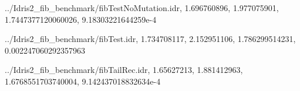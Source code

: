 \documentclass[
]{article}
\newenvironment{Shaded}{}{}
\newcommand{\DataTypeTok}[1]{\textcolor[rgb]{0.56,0.13,0.00}{#1}}
\newcommand{\FloatTok}[1]{\textcolor[rgb]{0.25,0.63,0.44}{#1}}
\newcommand{\NormalTok}[1]{#1}
\newcommand{\OperatorTok}[1]{\textcolor[rgb]{0.40,0.40,0.40}{#1}}
\begin{document}
\begin{Shaded}
\begin{Highlighting}[]
\OperatorTok{../}\DataTypeTok{Idris2\_fib\_benchmark}\OperatorTok{/}\NormalTok{fibTestNoMutation}\OperatorTok{.}\NormalTok{idr,}
\FloatTok{1.696760896}\NormalTok{,}
\FloatTok{1.977075901}\NormalTok{,}
\FloatTok{1.7447377120060026}\NormalTok{,}
\FloatTok{9.18303221644259e{-}4}

\OperatorTok{../}\DataTypeTok{Idris2\_fib\_benchmark}\OperatorTok{/}\NormalTok{fibTest}\OperatorTok{.}\NormalTok{idr,}
\FloatTok{1.734708117}\NormalTok{,}
\FloatTok{2.152951106}\NormalTok{,}
\FloatTok{1.786299514231}\NormalTok{,}
\FloatTok{0.002247060292357963}

\OperatorTok{../}\DataTypeTok{Idris2\_fib\_benchmark}\OperatorTok{/}\NormalTok{fibTailRec}\OperatorTok{.}\NormalTok{idr,}
\FloatTok{1.65627213}\NormalTok{,}
\FloatTok{1.881412963}\NormalTok{,}
\FloatTok{1.6768551703740004}\NormalTok{,}
\FloatTok{9.142437018832634e{-}4}


\end{Highlighting}
\end{Shaded}
\end{document}
